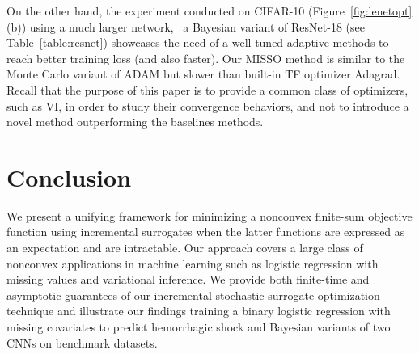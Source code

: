 \documentclass[11pt]{article}
\theoremstyle{t}
\begin{document}
On the other hand, the experiment conducted on CIFAR-10 (Figure~\ref{fig:lenetopt}(b)) using a much larger network, \ie\ a Bayesian variant of ResNet-18 (see Table~\ref{table:resnet}) showcases the need of a well-tuned adaptive methods to reach better training loss (and also faster). Our MISSO method is similar to the Monte Carlo variant of ADAM but slower than built-in TF optimizer Adagrad. Recall that the purpose of this paper is to provide a common class of optimizers, such as VI, in order to study their convergence behaviors, and not to introduce a novel method outperforming the baselines methods.
\vspace{-0.05in}
\section{Conclusion}
\vspace{-0.05in}
We present a unifying framework for minimizing a nonconvex finite-sum objective function using incremental surrogates when the latter functions are expressed as an expectation and are intractable.
Our approach covers a large class of nonconvex applications in machine learning such as logistic regression with missing values and variational inference.
We provide both finite-time and asymptotic guarantees of our incremental stochastic surrogate optimization technique and illustrate our findings training a binary logistic regression with missing covariates to predict hemorrhagic shock and Bayesian variants of two CNNs on benchmark datasets.

\newpage




\newpage

\appendix
\end{document}
